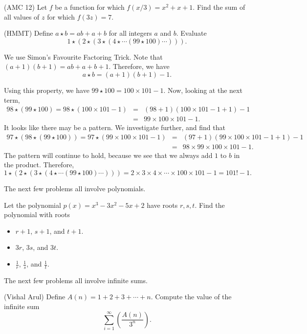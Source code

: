 \begin{exmp}(AMC 12)  Let $f$ be a function for which $f(x/3) = x^2 + x + 1$. Find the sum of all values of $z$ for which $f(3z) = 7$. \end{exmp}

\begin{exmp}(HMMT)  Define $a\star b=ab+a+b$ for all integers $a$ and $b$.  Evaluate $$1\star(2\star(3\star(4\star\cdots(99\star100)\cdots))).$$ \end{exmp}
\begin{soln}  
We use Simon's Favourite Factoring Trick.  Note that $(a+1)(b+1)=ab+a+b+1$.  Therefore, we have $$a\star b=(a+1)(b+1)-1.$$

Using this property, we have $99\star 100=100\times 101-1$.  Now, looking at the next term, \begin{eqnarray*} 98\star(99\star 100)=98\star(100\times 101-1)&=&(98+1)(100\times 101-1+1)-1 \\ &=&99\times 100\times 101-1. \end{eqnarray*}  
It looks like there may be a pattern.  We investigate further, and find that \begin{eqnarray*} 97\star\left(98\star(99\star 100)\right)=97\star(99\times 100\times 101-1)&=&\left(97+1\right)\left(99\times 100\times 101-1+1\right)-1 \\ &=&98\times 99\times 100\times 101-1. \end{eqnarray*}
The pattern will continue to hold, because we see that we always add $1$ to $b$ in the product.  Therefore, $$1\star(2\star(3\star(4\star\cdots(99\star100)\cdots)))=2\times 3\times 4\times \cdots \times 100\times 101-1=\boxed{101!-1}.$$
\end{soln}
The next few problems all involve polynomials.

\begin{exmp}  Let the polynomial $p(x)=x^3-3x^2-5x+2$ have roots $r,s,t$.  Find the polynomial with roots 
	\begin{itemize}
		\item $r+1$, $s+1$, and $t+1$.
		\item $3r$, $3s$, and $3t$.
		\item $\frac{1}{r}$, $\frac{1}{s}$, and $\frac{1}{t}$.
	\end{itemize}
\end{exmp}

The next few problems all involve infinite sums.

\begin{exmp}(Vishal Arul)  Define $A(n)=1+2+3+\cdots+n$.  Compute the value of the infinite sum $$\sum_{i=1}^{\infty}\left(\frac{A(n)}{3^n}\right).$$ \end{exmp}




